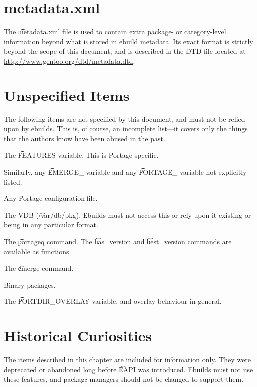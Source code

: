\chapter{metadata.xml}
\label{sec:metadata-xml}

The \t{metadata.xml} file is used to contain extra package- or category-level information beyond
what is stored in ebuild metadata. Its exact format is strictly beyond the scope of this document,
and is described in the DTD file located at \url{http://www.gentoo.org/dtd/metadata.dtd}.

\chapter{Unspecified Items}

The following items are not specified by this document, and must not be relied upon by ebuilds.
This is, of course, an incomplete list---it covers only the things that the authors know have
been abused in the past.

\begin{compactitem}
\item The \t{FEATURES} variable. This is Portage specific.
\item Similarly, any \t{EMERGE\_} variable and any \t{PORTAGE\_} variable not explicitly listed.
\item Any Portage configuration file.
\item The VDB (\t{/var/db/pkg}). Ebuilds must not access this or rely upon it existing or being
    in any particular format.
\item The \t{portageq} command. The \t{has\_version} and \t{best\_version} commands are
    available as functions.
\item The \t{emerge} command.
\item Binary packages.
\item The \t{PORTDIR\_OVERLAY} variable, and overlay behaviour in general.
\end{compactitem}

\chapter{Historical Curiosities}

The items described in this chapter are included for information only. They were deprecated or
abandoned long before \t{EAPI} was introduced. Ebuilds must not use these features, and package
managers should not be changed to support them.

